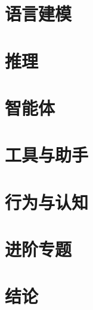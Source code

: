 


\tableofcontents
\clearpage

\part{语言建模}





\part{推理}




\part{智能体}



\part{工具与助手}





\part{行为与认知}





\part{进阶专题}





\part{结论}



